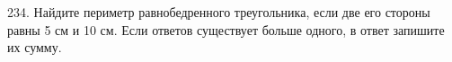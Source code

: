 234. Найдите периметр равнобедренного треугольника, если две его стороны равны 5 см и 10 см. Если ответов существует больше одного, в ответ запишите их сумму.\\
